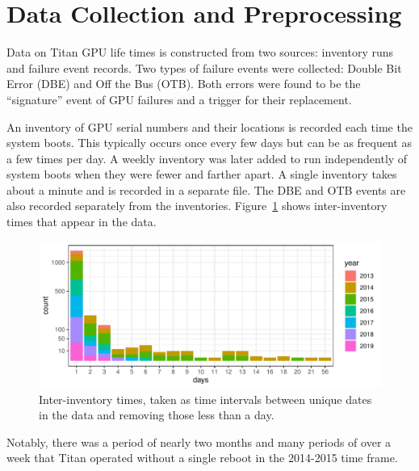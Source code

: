 \section{Data Collection and Preprocessing}
\label{section:dataprep}
Data on Titan GPU life times is constructed from two sources:
inventory runs and failure event records. Two types of failure events
were collected: Double Bit Error (DBE) and Off the Bus (OTB). Both
errors were found to be the ``signature'' event of GPU failures and a
trigger for their replacement.

An inventory of GPU serial numbers and their locations is recorded
each time the system boots. This typically occurs once every few days
but can be as frequent as a few times per day. A weekly inventory was
later added to run independently of system boots when they were fewer
and farther apart. A single inventory takes about a minute and is
recorded in a separate file. The DBE and OTB events are also recorded
separately from the inventories.  Figure~\ref{fig:inventory} shows
inter-inventory times that appear in the data.
\begin{figure}[bt]
  \begin{center}
    \includegraphics[width=\columnwidth]{figs/attention_intervals001.pdf}
  \end{center}
  \caption{Inter-inventory times, taken as time intervals between
    unique dates in the data and removing those less than a day.}
  \label{fig:inventory}
\end{figure}
Notably, there was a period of nearly two months and many periods of
over a week that Titan operated without a single reboot in the
2014-2015 time frame. 


